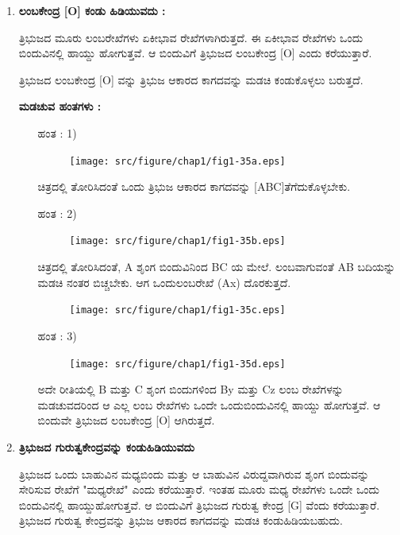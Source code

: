 \begin{enumerate}
    \item \textbf{ಲಂಬಕೇಂದ್ರ [O] ಕಂಡು ಹಿಡಿಯುವದು :}
 
 ತ್ರಿಭುಜದ ಮೂರು ಲಂಬರೇಖೆಗಳು ಏಕೀಭಾವ ರೇಖೆಗಳಾಗಿರುತ್ತದೆ. ಈ ಏಕೀಭಾವ ರೇಖೆಗಳು ಒಂದು ಬಿಂದುವಿನಲ್ಲಿ ಹಾಯ್ದು ಹೋಗುತ್ತವೆ. ಆ ಬಿಂದುವಿಗೆ ತ್ರಿಭುಜದ ಲಂಬಕೇಂದ್ರ [O] ಎಂದು ಕರೆಯುತ್ತಾರೆ. 
 
 ತ್ರಿಭುಜದ ಲಂಬಕೇಂದ್ರ [O] ವನ್ನು ತ್ರಿಭುಜ ಆಕಾರದ ಕಾಗದವನ್ನು ಮಡಚಿ ಕಂಡುಕೊಳ್ಳಲು ಬರುತ್ತದೆ. 
 
 
    \noindent
 \textbf{ಮಡಚುವ ಹಂತಗಳು :}
 
 \begin{itemize}
 \item[ಹಂತ : 1)]
 ~
 \begin{figure}[H]
\centering
\texttt{[image: src/figure/chap1/fig1-35a.eps]}
\end{figure}
 
 ಚಿತ್ರದಲ್ಲಿ ತೋರಿಸಿದಂತೆ ಒಂದು ತ್ರಿಭುಜ ಆಕಾರದ ಕಾಗದವನ್ನು [ABC]\break ತೆಗೆದುಕೊಳ್ಳಬೇಕು. 
 
 \item[ಹಂತ : 2)] 
 ~
 \begin{figure}[H]
\centering
\texttt{[image: src/figure/chap1/fig1-35b.eps]}
\end{figure}
 
 ಚಿತ್ರದಲ್ಲಿ ತೋರಿಸಿದಂತೆ, A ಶೃಂಗ ಬಿಂದುವಿನಿಂದ BC ಯ ಮೇಲೆ. ಲಂಬ\break ವಾಗುವಂತೆ AB ಬದಿಯನ್ನು ಮಡಚಿ ನಂತರ ಬಿಚ್ಚಬೇಕು. ಆಗ ಒಂದು\break  ಲಂಬರೇಖೆ (Ax) ದೊರಕುತ್ತದೆ. 
 \begin{figure}[H]
\centering
\texttt{[image: src/figure/chap1/fig1-35c.eps]}
\end{figure}
 
 \item[ಹಂತ : 3)] 
  ~
  \begin{figure}[H]
\centering
\texttt{[image: src/figure/chap1/fig1-35d.eps]}
\end{figure}
 
 ಅದೇ ರೀತಿಯಲ್ಲಿ  B ಮತ್ತು C ಶೃಂಗ ಬಿಂದುಗಳಿಂದ By ಮತ್ತು  Cz ಲಂಬ ರೇಖೆಗಳನ್ನು ಮಡಚುವದರಿಂದ ಆ  ಎಲ್ಲ ಲಂಬ ರೇಖೆಗಳು ಒಂದೇ ಒಂದು\break ಬಿಂದುವಿನಲ್ಲಿ ಹಾಯ್ದು ಹೋಗುತ್ತವೆ. ಆ ಬಿಂದುವೇ ತ್ರಿಭುಜದ ಲಂಬ\break ಕೇಂದ್ರ  [O] ಆಗಿರುತ್ತದೆ. 
  \end{itemize}
 
 \item \textbf{ತ್ರಿಭುಜದ ಗುರುತ್ವಕೇಂದ್ರವನ್ನು ಕಂಡುಹಿಡಿಯುವದು }
 
 ತ್ರಿಭುಜದ ಒಂದು ಬಾಹುವಿನ ಮಧ್ಯಬಿಂದು ಮತ್ತು ಆ ಬಾಹುವಿನ ವಿರುದ್ದವಾಗಿರುವ ಶೃಂಗ ಬಿಂದುವನ್ನು ಸೇರಿಸುವ ರೇಖೆಗೆ "ಮಧ್ಯರೇಖೆ" ಎಂದು ಕರೆಯು\-ತ್ತಾರೆ. ಇಂತಹ ಮೂರು ಮಧ್ಯ ರೇಖೆಗಳು ಒಂದೇ ಒಂದು ಬಿಂದುವಿನಲ್ಲಿ ಹಾಯ್ದು\break ಹೋಗುತ್ತವೆ. ಆ ಬಿಂದುವಿಗೆ ತ್ರಿಭುಜದ ಗುರುತ್ವ ಕೇಂದ್ರ [G] ವೆಂದು ಕರೆಯು\-ತ್ತಾರೆ. ತ್ರಿಭುಜದ ಗುರುತ್ವ ಕೇಂದ್ರವನ್ನು ತ್ರಿಭುಜ ಆಕಾರದ ಕಾಗದವನ್ನು ಮಡಚಿ ಕಂಡು\break ಹಿಡಿಯಬಹುದು. 
 

\end{enumerate}

